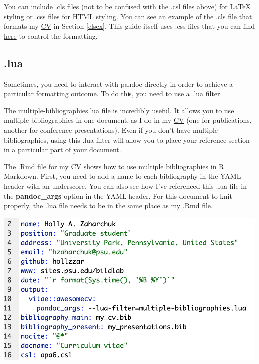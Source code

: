 \documentclass[
  openany]{book}
\begin{document}
You can include .cls files (not to be confused with the .csl files above) for LaTeX styling or .css files for HTML styling. You can see an example of the .cls file that formats my \href{https://github.com/hollzzar/zaharchuk-cv}{CV} in Section \ref{clsex}. This guide itself uses .css files that you can find \href{https://github.com/hollzzar/rmarkdown-guide}{here} to control the formatting.

\hypertarget{luaex}{%
\subsection{.lua}\label{luaex}}

Sometimes, you need to interact with pandoc directly in order to achieve a particular formatting outcome. To do this, you need to use a .lua filter.

The \href{https://github.com/pandoc/lua-filters/tree/master/multiple-bibliographies}{multiple-bibliographies.lua file} is incredibly useful. It allows you to use multiple bibliographies in one document, as I do in my \href{https://github.com/hollzzar/zaharchuk-cv}{CV} (one for publications, another for conference presentations). Even if you don't have multiple bibliographies, using this .lua filter will allow you to place your reference section in a particular part of your document.

The \href{https://github.com/hollzzar/zaharchuk-cv/blob/master/Zaharchuk_CV.Rmd}{.Rmd file for my CV} shows how to use multiple bibliographies in R Markdown. First, you need to add a name to each bibliography in the YAML header with an underscore. You can also see how I've referenced this .lua file in the \textbf{pandoc\_args} option in the YAML header. For this document to knit properly, the .lua file needs to be in the same place as my .Rmd file.

\includegraphics[width=\textwidth]{images/references_example}
\end{document}
